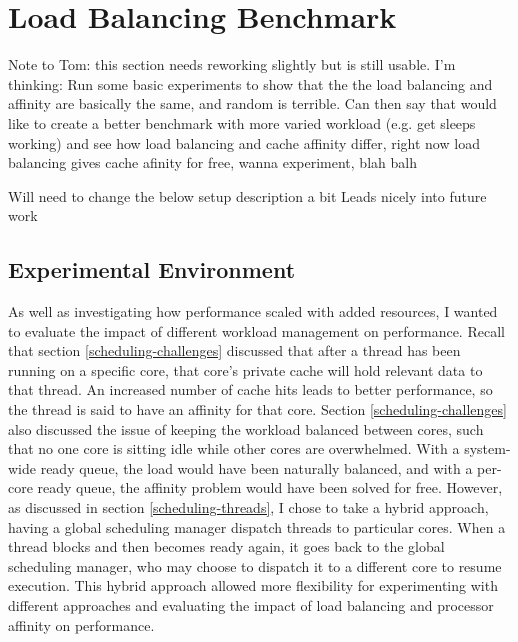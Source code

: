 \documentclass[bsc,frontabs,singlespacing,parskip,deptreport]{infthesis}     %
\begin{document}
\section{Load Balancing Benchmark} \label{cache-benchmark}
Note to Tom: this section needs reworking slightly but is still usable. I'm thinking:
Run some basic experiments to show that the the load balancing and affinity are basically the same, and random is terrible. Can then say that would like to create a better benchmark with more varied workload (e.g. get sleeps working) and see how load balancing and cache affinity differ, right now load balancing gives cache afinity for free, wanna experiment, blah balh

Will need to change the below setup description a bit
Leads nicely into future work

\subsection{Experimental Environment}
As well as investigating how performance scaled with added resources, I wanted to evaluate the impact of different workload management on performance. Recall that section \ref{scheduling-challenges} discussed that after a thread has been running on a specific core, that core's private cache will hold relevant data to that thread. An increased number of cache hits leads to better performance, so the thread is said to have an affinity for that core. Section \ref{scheduling-challenges} also discussed the issue of keeping the workload balanced between cores, such that no one core is sitting idle while other cores are overwhelmed. With a system-wide ready queue, the load would have been naturally balanced, and with a per-core ready queue, the affinity problem would have been solved for free. However, as discussed in section \ref{scheduling-threads}, I chose to take a hybrid approach, having a global scheduling manager dispatch threads to particular cores. When a thread blocks and then becomes ready again, it goes back to the global scheduling manager, who may choose to dispatch it to a different core to resume execution. This hybrid approach allowed more flexibility for experimenting with different approaches and evaluating the impact of load balancing and processor affinity on performance. \\
\end{document}

